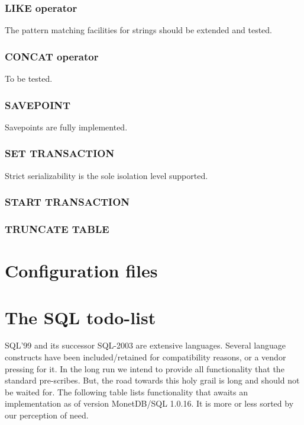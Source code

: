\documentclass[10pt,twocolumn,fleqn]{article}
\begin{document}
\subsubsection*{LIKE operator}
The pattern matching facilities for strings should be extended and tested.

\subsubsection*{CONCAT operator}
To be tested.

\subsubsection*{SAVEPOINT}
Savepoints are fully implemented.

\subsubsection*{SET TRANSACTION}
Strict serializability is the sole isolation level supported.

\subsubsection*{START TRANSACTION}
\subsubsection*{TRUNCATE TABLE}

\section{Configuration files}
\label{configfile}

\section{The SQL todo-list}
SQL'99 and its successor SQL-2003 are extensive languages.
Several language constructs have been included/retained for
compatibility reasons, or a vendor pressing for it.
In the long run we intend to provide all functionality that
the standard pre-scribes. But, the road towards this holy grail
is long and should not be waited for.
The following table lists functionality that awaits an implementation
as of version MonetDB/SQL 1.0.16. It is more or less sorted by
our perception of need.
\end{document}
